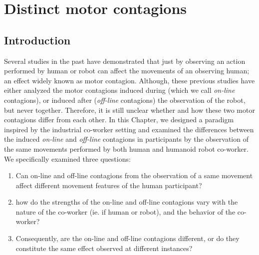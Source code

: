 
{\color{blue}\chapter{Distinct motor contagions}\label{distinct motor contagion}}

\section{Introduction}

Several studies in the past have demonstrated that just by observing an action performed by human or robot can affect the movements of an observing human; an effect widely known as motor contagion. Although, these previous studies have either analyzed the motor contagions induced during (which we call \emph{on-line} contagions), or induced after (\emph{off-line} contagions) the observation of the robot, but never together. Therefore, it is still unclear whether and how these two motor contagions differ from each other. In this Chapter, we designed a paradigm inspired by the industrial co-worker setting and examined the differences between the induced \textit{on-line} and \textit{off-line} contagions in participants by the observation of the same movements performed by both human and humanoid robot co-worker. We specifically examined three questions:

\begin{enumerate}
	\item Can on-line and off-line contagions from the observation of a same movement affect different movement features of the human participant?
	\item how do the strengths of the on-line and off-line contagions vary with the nature of the co-worker (ie. if human or robot), and the behavior of the co-worker?
	\item Consequently, are the on-line and off-line contagions different, or do they constitute the same effect observed at different instances?
\end{enumerate}


\clearpage

